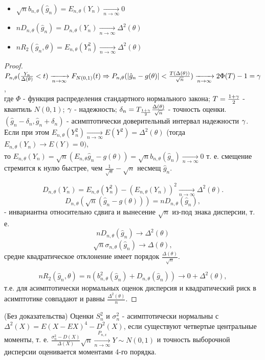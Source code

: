 \begin{proposition}
  \enewline
  \begin{itemize}
    \item $\sqrt{n}b_{n, \theta}(\hat{g}_n) = E_{n, \theta}(Y_n) \xrightarrow[n \to \infty]{} 0$
    \item $nD_{n, \theta}(\hat{g}_n) = D_{n, \theta}(Y_n) \xrightarrow[n \to \infty]{} \Delta^2(\theta)$
    \item $nR_2(\hat{g}_n, \theta) = E_{n, \theta}(Y^2_n) \xrightarrow[n \to \infty]{} \Delta^2(\theta)$
  \end{itemize}
\end{proposition}
\begin{proof}
  $P_{n, \theta}(\frac{Y_n}{\Delta(\theta)} < t) \xrightarrow[n \to \infty]{} F_{N(0, 1)}(t) \Rightarrow{} P_{n, \theta}(|\hat{g}_n - g(\theta)| < \frac{T(\Delta(\theta))} {\sqrt{n}}) \xrightarrow[n \to \infty]{} 2\Phi(T) - 1 = \gamma$, \\
  где $\Phi$ - функция распределения стандартного нормального закона; $T = \frac{1 + \gamma}{2}$ - квантиль $N(0, 1)$;
  $\gamma$ - надежность; $\delta_n = T_{\frac{1 + \gamma}{2}}\frac{\Delta(\theta)}{\sqrt{n}}$ - точность оценки. \\
  $(\hat{g}_n - \delta_n, \hat{g}_n + \delta_n)$ - асимптотически доверительный интервал надежности $\gamma$. \\
  Если при этом $E_{n, \theta}(Y_n^2) \xrightarrow[n \to \infty]{} E(Y^2) = \Delta^2(\theta)$ (тогда $E_{n, \theta}(Y_n) \xrightarrow[]{} E(Y) = 0)$, \\
  то $E_{n, \theta}(Y_n) = \sqrt{n}(E_{n, \theta}\hat{g}_n - g(\theta)) = \sqrt{n}b_{n, \theta}(\hat{g}_n) \xrightarrow[n \to \infty]{} 0$
  т. е. смещение стремится к нулю быстрее, чем $\frac{1}{\sqrt{n}} - \sqrt{n}$ несмещ $\hat{g}_n$.

  \[
    D_{n, \theta}(Y_n) = E_{n, \theta}(Y_n^2) - (E_{n, \theta}(Y_n))^2 \xrightarrow[n \to \infty]{} \Delta^2(\theta)
  .\]
  \[
    D_{n, \theta}(\sqrt{n}(\hat{g}_n - g(\theta))) = nD_{n, \theta}(\hat{g}_n)
  ,\] - инвариантна относительно сдвига и вынесение $\sqrt{n}$ из-под знака дисперсии, т. е.
  \[
    nD_{n, \theta}(\hat{g}_n) \xrightarrow[]{} \Delta^2(\theta)
  \]
  \[
    \sqrt{n}\sigma_{n, \theta}(\hat{g}_n) \xrightarrow[]{} \Delta(\theta)
  ,\]
  средне квадратическое отклонение имеет порядок $\frac{\Delta(\theta)}{\sqrt{n}}$.

  \[
    nR_2(\hat{g}_n, \theta) = n(b_{n, \theta}^2(\hat{g}_n) + D_{n, \theta}(\hat{g}_n)) \xrightarrow[]{} 0 + \Delta^2(\theta)
  ,\]
  т.е. для асимптотически нормальных оценок дисперсия и квадратический риск в асимптотике совпадают и равны $\frac{\Delta^2(\theta)}{n}$.
\end{proof}

\begin{proposition}
  (Без доказательства) Оценки $S^2_n$ и $\sigma^2_n$ - асимптотически нормальны с $\Delta^2(X) = E(X - EX)^4 - D^2(X)$, если существуют четвертые центральные моменты,
  т. е. $\frac{\sigma^2_n - D(X)}{\Delta(X)}\sqrt{n} \xrightarrow[n \to \infty]{P_{n, x}} Y \sim N(0, 1)$ и точность выборочной дисперсии оценивается моментами 4-го порядка.
\end{proposition}

